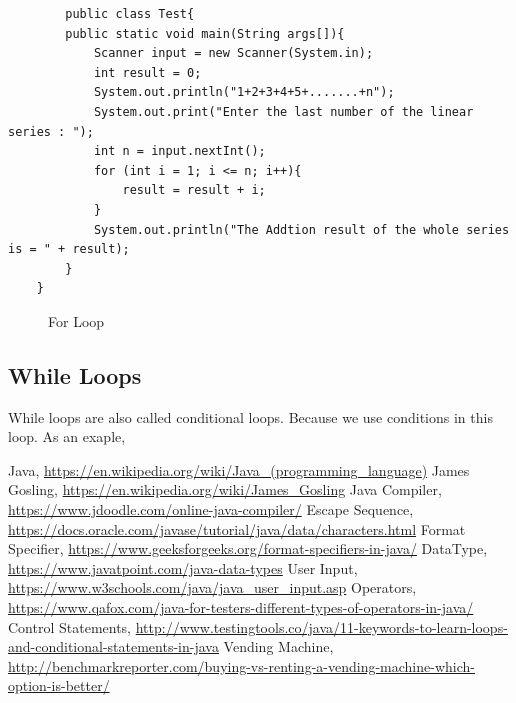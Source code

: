 \documentclass[openany]{book}  %
\begin{document}
\begin{flushleft}
\begin{center}
\begin{verbatim}
        public class Test{
        public static void main(String args[]){
            Scanner input = new Scanner(System.in);
            int result = 0;
            System.out.println("1+2+3+4+5+.......+n");
            System.out.print("Enter the last number of the linear series : ");
            int n = input.nextInt();
            for (int i = 1; i <= n; i++){
                result = result + i;
            }
            System.out.println("The Addtion result of the whole series is = " + result);
        }
    }
    \end{verbatim}
    \end{center}
    \begin{figure}[htbp]
        \begin{center}
            \caption{For Loop}
        \end{center}
    \end{figure}
    \subsection{While Loops}
    While loops are also called conditional loops. Because we use conditions in this loop. As an exaple,














    \printindex
    \begin{thebibliography}{90}
        \footnotesize
         Java, \url{https://en.wikipedia.org/wiki/Java_(programming_language)}
         James Gosling, \url{https://en.wikipedia.org/wiki/James_Gosling}
         Java Compiler, \url{https://www.jdoodle.com/online-java-compiler/}
         Escape Sequence, \url{https://docs.oracle.com/javase/tutorial/java/data/characters.html}
         Format Specifier,  \footnotesize{\url{https://www.geeksforgeeks.org/format-specifiers-in-java/}}
         DataType, \url{https://www.javatpoint.com/java-data-types}
         User Input, \url{https://www.w3schools.com/java/java_user_input.asp}
         Operators, \url{https://www.qafox.com/java-for-testers-different-types-of-operators-in-java/}
         Control Statements, \url{http://www.testingtools.co/java/11-keywords-to-learn-loops-and-conditional-statements-in-java}
         Vending Machine, \url{http://benchmarkreporter.com/buying-vs-renting-a-vending-machine-which-option-is-better/}
    \end{thebibliography}




\end{flushleft}
\end{document}
